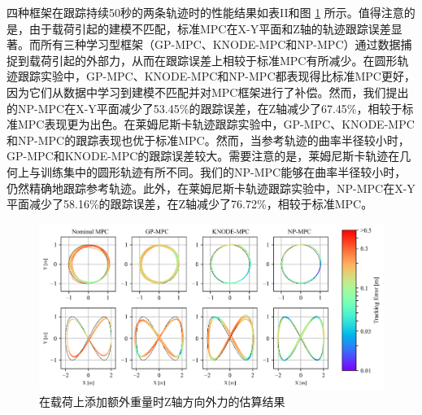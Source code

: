 \documentclass[lang=chs, degree=master, blindreview=false, winfonts=true]{yanputhesis}
\begin{document}
四种框架在跟踪持续50秒的两条轨迹时的性能结果如表II和图 \ref{color} 所示。值得注意的是，由于载荷引起的建模不匹配，标准MPC在X-Y平面和Z轴的轨迹跟踪误差显著。而所有三种学习型框架（GP-MPC、KNODE-MPC和NP-MPC）通过数据捕捉到载荷引起的外部力，从而在跟踪误差上相较于标准MPC有所减少。在圆形轨迹跟踪实验中，GP-MPC、KNODE-MPC和NP-MPC都表现得比标准MPC更好，因为它们从数据中学习到建模不匹配并对MPC框架进行了补偿。然而，我们提出的NP-MPC在X-Y平面减少了53.45\%的跟踪误差，在Z轴减少了67.45\%，相较于标准MPC表现更为出色。在莱姆尼斯卡轨迹跟踪实验中，GP-MPC、KNODE-MPC和NP-MPC的跟踪表现也优于标准MPC。然而，当参考轨迹的曲率半径较小时，GP-MPC和KNODE-MPC的跟踪误差较大。需要注意的是，莱姆尼斯卡轨迹在几何上与训练集中的圆形轨迹有所不同。我们的NP-MPC能够在曲率半径较小时，仍然精确地跟踪参考轨迹。此外，在莱姆尼斯卡轨迹跟踪实验中，NP-MPC在X-Y平面减少了58.16\%的跟踪误差，在Z轴减少了76.72\%，相较于标准MPC。

\begin{figure}[hbt!]
	\centering
	\includegraphics[width=38pc]{picture/kk/color.png} 
	\caption{在载荷上添加额外重量时Z轴方向外力的估算结果} 
	\label{color}
\end{figure}
\end{document}
